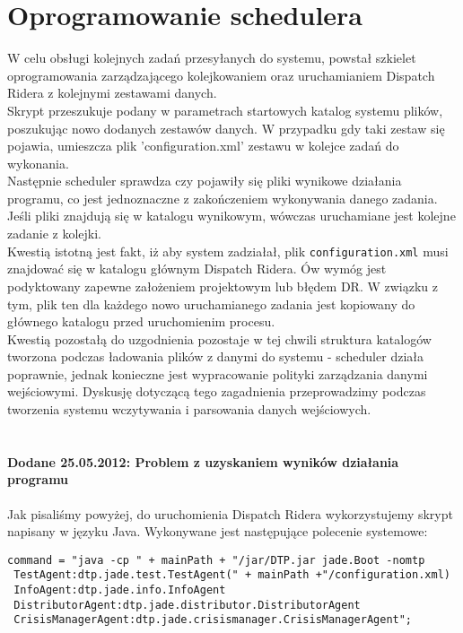 \lstset{language=Java}
\chapter{Oprogramowanie schedulera}
W celu obsługi kolejnych zadań przesyłanych do systemu, powstał szkielet oprogramowania zarządzającego kolejkowaniem oraz uruchamianiem Dispatch Ridera z kolejnymi zestawami danych.
\\
Skrypt przeszukuje podany w parametrach startowych katalog systemu plików, poszukując nowo dodanych zestawów danych. W przypadku gdy taki zestaw się pojawia, umieszcza plik 'configuration.xml' zestawu w kolejce zadań do wykonania.
\\
Następnie scheduler sprawdza czy pojawiły się pliki wynikowe działania programu, co jest jednoznaczne z zakończeniem wykonywania danego zadania. Jeśli pliki znajdują się w katalogu wynikowym, wówczas uruchamiane jest kolejne zadanie z kolejki. 
\\
Kwestią istotną jest fakt, iż aby system zadziałał, plik \texttt{configuration.xml} musi znajdować się w katalogu głównym Dispatch Ridera. Ów wymóg jest podyktowany zapewne założeniem projektowym lub błędem DR. W związku z tym, plik ten dla każdego nowo uruchamianego zadania jest kopiowany do głównego katalogu przed uruchomienim procesu. 
\\
Kwestią pozostałą do uzgodnienia pozostaje w tej chwili struktura katalogów tworzona podczas ładowania plików z danymi do systemu - scheduler działa poprawnie, jednak konieczne jest wypracowanie polityki zarządzania danymi wejściowymi. Dyskusję dotyczącą tego zagadnienia przeprowadzimy podczas tworzenia systemu wczytywania i parsowania danych wejściowych.
\\\\
\subsubsection{Dodane 25.05.2012: Problem z uzyskaniem wyników działania programu}

Jak pisaliśmy powyżej, do uruchomienia Dispatch Ridera wykorzystujemy skrypt napisany w języku Java. Wykonywane jest następujące polecenie systemowe:

\begin{verbatim}
command = "java -cp " + mainPath + "/jar/DTP.jar jade.Boot -nomtp
 TestAgent:dtp.jade.test.TestAgent(" + mainPath +"/configuration.xml)
 InfoAgent:dtp.jade.info.InfoAgent
 DistributorAgent:dtp.jade.distributor.DistributorAgent
 CrisisManagerAgent:dtp.jade.crisismanager.CrisisManagerAgent";
\end{verbatim}

